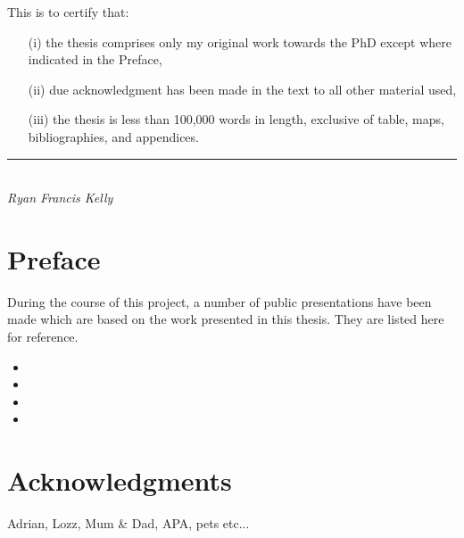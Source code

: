 


This is to certify that:
\begin{itemize}
\item[(i)] the thesis comprises only my original work towards the PhD except where indicated in the Preface,
\item[(ii)] due acknowledgment has been made in the text to all other material used,
\item[(iii)] the thesis is less than 100,000 words in length, exclusive of table, maps, bibliographies, and appendices.
\end{itemize}
\vspace{3cm}
\rule{70mm}{0.1mm}\\
\emph{Ryan Francis Kelly}

\chapter*{Preface} %
During the course of this project, a number of public presentations have been made which are based on the work
presented in this thesis. They are listed here for reference.
\nobibliography*
\begin{itemize}
\item {}
\item {}
\item {}
\item {}
\end{itemize}


\chapter*{Acknowledgments} %

Adrian, Lozz, Mum \& Dad, APA, pets etc...

\singlespace    %
\tableofcontents
\listoftables
\listoffigures

\newpage
{}








\appendix


\singlespace





